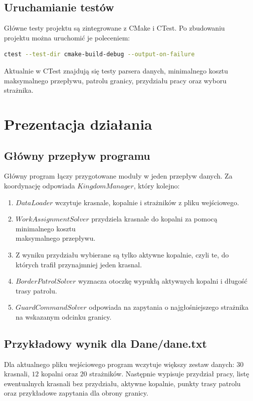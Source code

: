 \documentclass{article}
\begin{document}
\subsection{Uruchamianie testów}
Główne testy projektu są zintegrowane z CMake i CTest. Po zbudowaniu projektu można uruchomić je poleceniem:
\begin{lstlisting}[language=bash]
ctest --test-dir cmake-build-debug --output-on-failure
\end{lstlisting}
Aktualnie w CTest znajdują się testy parsera danych, minimalnego kosztu maksymalnego przepływu, patrolu granicy, przydziału pracy oraz wyboru strażnika.

\section{Prezentacja działania}

\subsection{Główny przepływ programu}
Główny program łączy przygotowane moduły w jeden przepływ danych. Za koordynację odpowiada $KingdomManager$, który kolejno:
\begin{enumerate}
    \item $DataLoader$ wczytuje krasnale, kopalnie i strażników z pliku wejściowego.
    \item $WorkAssignmentSolver$ przydziela krasnale do kopalni za pomocą minimalnego kosztu \\ maksymalnego przepływu.
    \item Z wyniku przydziału wybierane są tylko aktywne kopalnie, czyli te, do których trafił przynajmniej jeden krasnal.
    \item $BorderPatrolSolver$ wyznacza otoczkę wypukłą aktywnych kopalni i długość trasy patrolu.
    \item $GuardCommandSolver$ odpowiada na zapytania o najgłośniejszego strażnika na wskazanym odcinku granicy.
\end{enumerate}

\subsection{Przykładowy wynik dla Dane/dane.txt}
Dla aktualnego pliku wejściowego program wczytuje większy zestaw danych: $30$ krasnali, $12$ kopalni oraz $20$ strażników. Następnie wypisuje przydział pracy, listę ewentualnych krasnali bez przydziału, aktywne kopalnie, punkty trasy patrolu oraz przykładowe zapytania dla obrony granicy.
\end{document}
